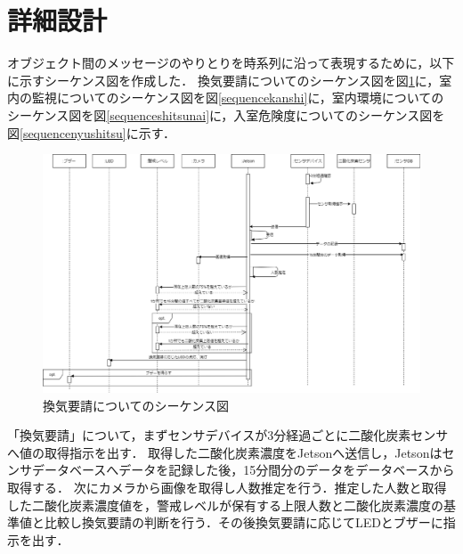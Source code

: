
\section{詳細設計}

オブジェクト間のメッセージのやりとりを時系列に沿って表現するために，以下に示すシーケンス図を作成した．
換気要請についてのシーケンス図を図\ref{sequencekanki}に，室内の監視についてのシーケンス図を図\ref{sequencekanshi}に，室内環境についてのシーケンス図を図\ref{sequenceshitsunai}に，入室危険度についてのシーケンス図を図\ref{sequencenyushitsu}に示す．

\begin{figure}
	\centering
	\includegraphics[width=15cm]{./uml/sequence_kanki_2}
	\caption{換気要請についてのシーケンス図}
	\label{sequencekanki}
\end{figure}

「換気要請」について，まずセンサデバイスが3分経過ごとに二酸化炭素センサへ値の取得指示を出す．
取得した二酸化炭素濃度をJetsonへ送信し，Jetsonはセンサデータベースへデータを記録した後，15分間分のデータをデータベースから取得する．
次にカメラから画像を取得し人数推定を行う．推定した人数と取得した二酸化炭素濃度値を，警戒レベルが保有する上限人数と二酸化炭素濃度の基準値と比較し換気要請の判断を行う．その後換気要請に応じてLEDとブザーに指示を出す．

